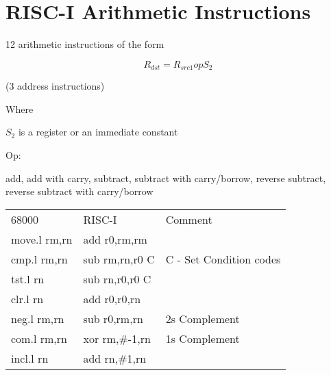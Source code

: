 \documentclass[a4paper,12pt]{article}
\begin{document}
\section*{RISC-I Arithmetic Instructions}

12 arithmetic instructions of the form

\[ R_{dst} = R_{src1} op S_{2} \]

($3$ address instructions)

Where

$S_{2}$ is a register or an immediate constant

Op:

add, add with carry, subtract, subtract with carry/borrow, reverse
subtract, reverse subtract with carry/borrow

\begin{tabular}{l l l}
68000 			&	RISC-I 				&	Comment	\\
move.l rm,rn	&	add r0,rm,rm 		&	\\
cmp.l rm,rn		&	sub rm,rn,r0 {C}	& {C} - Set Condition codes	\\
tst.l rn			&	sub rn,r0,r0 {C}	&	\\
clr.l rn			&	add r0,r0,rn		&	\\
neg.l rm,rn		&	sub r0,rm,rn		& 2s Complement \\
com.l rm,rn		&	xor rm,\#-1,rn		& 1s Complement \\
incl.l rn		&	add rn,\#1,rn		&	\\
\end{tabular}
\end{document}
